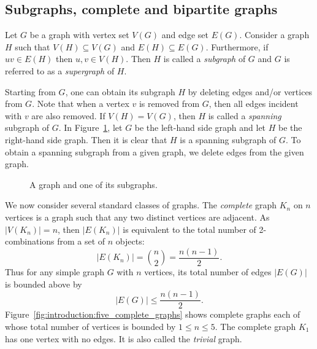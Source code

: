 
\subsection{Subgraphs, complete and bipartite graphs}

Let $G$ be a graph with vertex set $V(G)$ and edge set
$E(G)$. Consider a graph $H$ such that $V(H) \subseteq V(G)$ and $E(H)
\subseteq E(G)$. Furthermore, if $uv \in E(H)$ then $u,v \in
V(H)$. Then $H$ is called a \emph{subgraph} of $G$ and $G$ is referred
to as a \emph{supergraph} of $H$.

Starting from $G$, one can obtain its subgraph $H$ by deleting edges
and/or vertices from $G$. Note that when a vertex $v$ is removed from
$G$, then all edges incident with $v$ are also removed. If $V(H) =
V(G)$, then $H$ is called a \emph{spanning} subgraph of $G$. In
Figure~\ref{fig:introduction:star_subgraph}, let $G$ be the left-hand
side graph and let $H$ be the right-hand side graph. Then it is clear
that $H$ is a spanning subgraph of $G$. To obtain a spanning subgraph
from a given graph, we delete edges from the given graph.

\begin{figure}[!htbp]
\centering

\caption{A graph and one of its subgraphs.}
\label{fig:introduction:star_subgraph}
\end{figure}

We now consider several standard classes of graphs. The \emph{complete}
graph $K_n$ on $n$ vertices is a graph such that any two distinct
vertices are adjacent. As $|V(K_n)| = n$, then $|E(K_n)|$ is
equivalent to the total number of 2-combinations from a set of $n$
objects:
%
\begin{equation}
\label{eq:introduction:size_of_K_n}
|E(K_n)|
=
\binom{n}{2}
=
\frac{n(n-1)}{2}.
\end{equation}
%
Thus for any simple graph $G$ with $n$ vertices, its total number of
edges $|E(G)|$ is bounded above by
%
\begin{equation}
\label{eq:introduction:upper_bound_total_edges_simple_graph}
|E(G)|
\leq
\frac{n(n - 1)}{2}.
\end{equation}
%
Figure~\ref{fig:introduction:five_complete_graphs} shows complete
graphs each of whose total number of vertices is bounded by
$1 \leq n \leq 5$. The complete graph $K_1$ has one vertex with
no edges. It is also called the \emph{trivial} graph.

